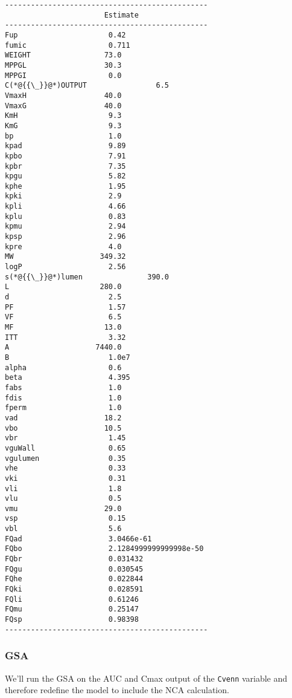 \documentclass[12pt,a4paper]{article}
\begin{document}
\begin{lstlisting}
-----------------------------------------------
                       Estimate
-----------------------------------------------
Fup                     0.42
fumic                   0.711
WEIGHT                 73.0
MPPGL                  30.3
MPPGI                   0.0
C(*@{{\_}}@*)OUTPUT                6.5
VmaxH                  40.0
VmaxG                  40.0
KmH                     9.3
KmG                     9.3
bp                      1.0
kpad                    9.89
kpbo                    7.91
kpbr                    7.35
kpgu                    5.82
kphe                    1.95
kpki                    2.9
kpli                    4.66
kplu                    0.83
kpmu                    2.94
kpsp                    2.96
kpre                    4.0
MW                    349.32
logP                    2.56
s(*@{{\_}}@*)lumen               390.0
L                     280.0
d                       2.5
PF                      1.57
VF                      6.5
MF                     13.0
ITT                     3.32
A                    7440.0
B                       1.0e7
alpha                   0.6
beta                    4.395
fabs                    1.0
fdis                    1.0
fperm                   1.0
vad                    18.2
vbo                    10.5
vbr                     1.45
vguWall                 0.65
vgulumen                0.35
vhe                     0.33
vki                     0.31
vli                     1.8
vlu                     0.5
vmu                    29.0
vsp                     0.15
vbl                     5.6
FQad                    3.0466e-61
FQbo                    2.1284999999999998e-50
FQbr                    0.031432
FQgu                    0.030545
FQhe                    0.022844
FQki                    0.028591
FQli                    0.61246
FQmu                    0.25147
FQsp                    0.98398
-----------------------------------------------
\end{lstlisting}


\subsubsection{GSA}
We'll run the GSA on the AUC and Cmax output of the \texttt{Cvenn} variable and therefore redefine the model to include the NCA calculation.
\end{document}
